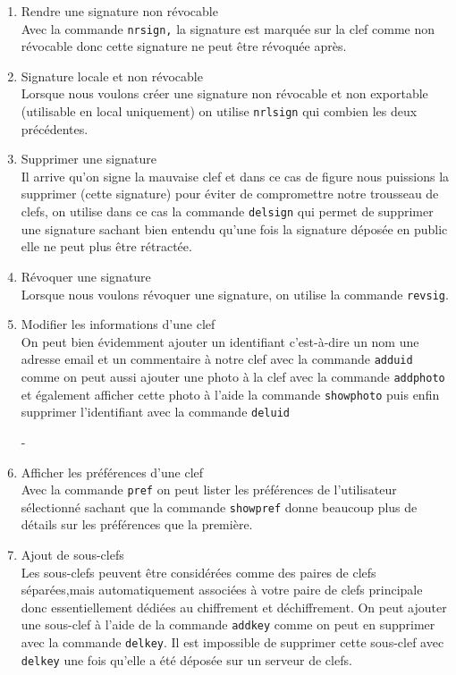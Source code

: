 \begin{enumerate}
\item Rendre une signature non révocable\\
Avec la commande \texttt{nrsign,} la signature est marquée sur la clef comme non révocable donc cette signature ne peut être 
révoquée après.

\item Signature locale et non révocable\\
Lorsque nous voulons créer une signature non révocable et non exportable (utilisable en local uniquement) on utilise \texttt{nrlsign}
 qui combien les deux précédentes.
\item Supprimer une signature\\
Il arrive qu'on signe la mauvaise clef et dans ce cas de figure nous puissions la supprimer (cette signature)  pour éviter de compromettre
 notre trousseau de clefs, on utilise dans ce cas la commande \texttt{delsign} qui permet de supprimer une signature sachant bien
 entendu qu'une fois la signature déposée en public elle ne peut plus être  rétractée.
\item Révoquer une signature\\
Lorsque nous voulons révoquer une signature, on utilise la commande \texttt{revsig}.
\item Modifier les informations d'une clef\\
On peut bien évidemment ajouter un identifiant c'est-à-dire un nom une adresse email et un commentaire à notre clef avec 
la commande \texttt{adduid} comme on peut aussi  ajouter une photo à la clef avec la commande \texttt{addphoto} et également afficher 
cette photo à l'aide la commande \texttt{showphoto} puis enfin supprimer l'identifiant avec la commande \texttt{deluid}

-\item Afficher les préférences d'une clef\\
Avec la commande \texttt{pref} on peut lister les préférences de l'utilisateur sélectionné sachant que la commande \texttt{showpref}
 donne beaucoup plus de détails sur les préférences que la première.

\newpage

\item Ajout de sous-clefs\\
Les sous-clefs peuvent être considérées comme des paires de clefs séparées,mais automatiquement associées à votre paire de clefs 
principale donc essentiellement dédiées au chiffrement et déchiffrement.
On peut ajouter une sous-clef à l'aide de la commande \texttt{addkey} comme on peut en supprimer avec la commande \texttt{delkey}.
Il est impossible de supprimer cette sous-clef avec \texttt{delkey} une fois qu'elle a été déposée sur un serveur de clefs.


\end{enumerate}
